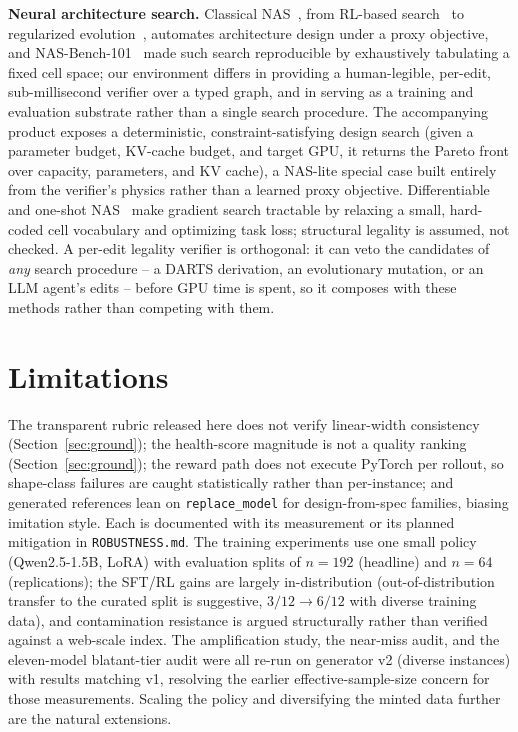 \documentclass[11pt]{article}
\begin{document}
\textbf{Neural architecture search.} Classical NAS~\cite{nassurvey}, from RL-based search~\cite{zophle} to regularized evolution~\cite{amoeba}, automates architecture design under a proxy objective, and NAS-Bench-101~\cite{nasbench} made such search reproducible by exhaustively tabulating a fixed cell space; our environment differs in providing a human-legible, per-edit, sub-millisecond verifier over a typed graph, and in serving as a training and evaluation substrate rather than a single search procedure. The accompanying product exposes a deterministic, constraint-satisfying design search (given a parameter budget, KV-cache budget, and target GPU, it returns the Pareto front over capacity, parameters, and KV cache), a NAS-lite special case built entirely from the verifier's physics rather than a learned proxy objective. Differentiable and one-shot NAS~\cite{darts} make gradient search tractable by relaxing a small, hard-coded cell vocabulary and optimizing task loss; structural legality is assumed, not checked. A per-edit legality verifier is orthogonal: it can veto the candidates of \emph{any} search procedure -- a DARTS derivation, an evolutionary mutation, or an LLM agent's edits -- before GPU time is spent, so it composes with these methods rather than competing with them.

\section{Limitations}
The transparent rubric released here does not verify linear-width consistency (Section~\ref{sec:ground}); the health-score magnitude is not a quality ranking (Section~\ref{sec:ground}); the reward path does not execute PyTorch per rollout, so shape-class failures are caught statistically rather than per-instance; and generated references lean on \texttt{replace\_model} for design-from-spec families, biasing imitation style. Each is documented with its measurement or its planned mitigation in \texttt{ROBUSTNESS.md}. The training experiments use one small policy (Qwen2.5-1.5B, LoRA) with evaluation splits of $n{=}192$ (headline) and $n{=}64$ (replications); the SFT/RL gains are largely in-distribution (out-of-distribution transfer to the curated split is suggestive, $3/12\to6/12$ with diverse training data), and contamination resistance is argued structurally rather than verified against a web-scale index. The amplification study, the near-miss audit, and the eleven-model blatant-tier audit were all re-run on generator v2 (diverse instances) with results matching v1, resolving the earlier effective-sample-size concern for those measurements. Scaling the policy and diversifying the minted data further are the natural extensions.
\end{document}
